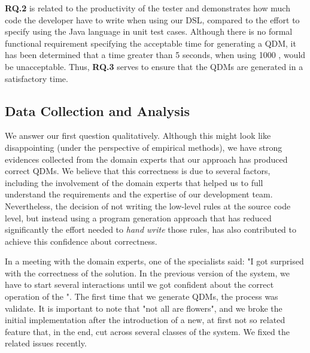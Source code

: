 \textbf{RQ.2} is related to the productivity of the tester and demonstrates how much code the 
developer have to write when using our DSL, compared to the effort to specify \callers using the Java language in 
unit test cases. Although there is no formal functional requirement specifying the  acceptable time for generating a QDM, 
it has been determined that a time greater than 5 seconds, when using 1000 \callers, would be unacceptable. 
Thus, \textbf{RQ.3} serves to ensure that the QDMs are generated in a satisfactory time.



\subsection{Data Collection and Analysis}

We answer our first question qualitatively. Although this might look like disappointing (under the 
perspective of empirical methods), we have strong evidences collected from the domain experts 
that our approach has produced correct QDMs. We believe that this correctness is due to several 
factors, including the involvement of the domain experts that helped us to full understand 
the requirements and the expertise of our development team. Nevertheless, the decision of 
not writing the low-level rules at the source code level, but instead using a program 
generation approach that has reduced significantly the effort needed to \emph{hand write} 
those rules, has also contributed to achieve this confidence about correctness. 

In a meeting 
with the domain experts, one of the specialists said: "I got surprised with the 
correctness of the solution. In the previous version of the system, we have to start several 
interactions until we got confident about the correct operation of the \callers". The first 
time that we generate QDMs, the process was validate. It is important to note that "not all 
are flowers", and we broke the initial implementation after the introduction of a new, 
at first not so related feature that, in the end, cut across several classes of 
the system. We fixed the related issues recently.  

